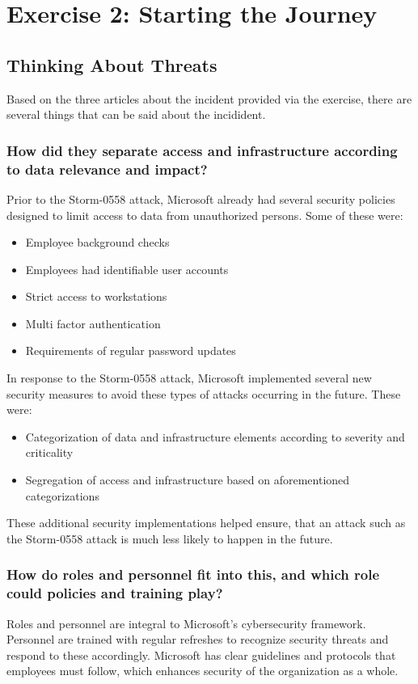 \section{Exercise 2: Starting the Journey}
\subsection{Thinking About Threats}
Based on the three articles about the incident provided via the exercise, there are several things that can be said about the incidident.
\subsubsection{How did they separate access and infrastructure according to data relevance and impact?}
Prior to the Storm-0558 attack, Microsoft already had several security policies designed to limit access to data from unauthorized persons. Some of these were:

\begin{itemize}
    \item Employee background checks
    \item Employees had identifiable user accounts
    \item Strict access to workstations
    \item Multi factor authentication
    \item Requirements of regular password updates
\end{itemize}

In response to the Storm-0558 attack, Microsoft implemented several new security measures to avoid these types of attacks occurring in the future. These were:

\begin{itemize}
    \item Categorization of data and infrastructure elements according to severity and criticality
    \item Segregation of access and infrastructure based on aforementioned categorizations
\end{itemize}

These additional security implementations helped ensure, that an attack such as the Storm-0558 attack is much less likely to happen in the future.

\subsubsection{How do roles and personnel fit into this, and which role could policies and training play?}
Roles and personnel are integral to Microsoft's cybersecurity framework. Personnel are trained with regular refreshes to recognize security threats and respond to these accordingly. Microsoft has clear guidelines and protocols that employees must follow, which enhances security of the organization as a whole.

